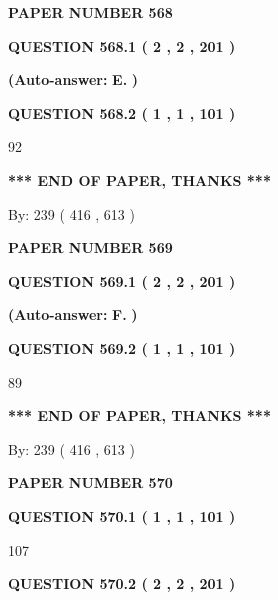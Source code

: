 \documentclass[12pt]{article}
\begin{document}
   
\newpage 
\setcounter{page}{ 
   568001 } 
   
   
 {\textbf{ \Large{ PAPER NUMBER  568  }}}
   
   
   
   
  
  
{\textbf{\large{QUESTION
568.1 
 ( 2 , 2 , 201 )
}}}
 
 
{\textbf{(Auto-answer:}}
{\textbf{\large{
E.}}}
{\textbf{)}}
 
 
  
  
{\textbf{\large{QUESTION
568.2 
 ( 1 , 1 , 101 )
}}}

92
   
   
   
   
\vspace{1.0in} 
{\textbf{\large{ *** END OF PAPER, THANKS *** }}} 
   
   
\hspace{1.0in} By: 
 239 ( 416 ,  613 )
   
   
   
   
\newpage 
\setcounter{page}{ 
   569001 } 
   
   
 {\textbf{ \Large{ PAPER NUMBER  569  }}}
   
   
   
   
  
  
{\textbf{\large{QUESTION
569.1 
 ( 2 , 2 , 201 )
}}}
 
 
{\textbf{(Auto-answer:}}
{\textbf{\large{
F.}}}
{\textbf{)}}
 
 
  
  
{\textbf{\large{QUESTION
569.2 
 ( 1 , 1 , 101 )
}}}

89
   
   
   
   
\vspace{1.0in} 
{\textbf{\large{ *** END OF PAPER, THANKS *** }}} 
   
   
\hspace{1.0in} By: 
 239 ( 416 ,  613 )
   
   
   
   
\newpage 
\setcounter{page}{ 
   570001 } 
   
   
 {\textbf{ \Large{ PAPER NUMBER  570  }}}
   
   
   
   
  
  
{\textbf{\large{QUESTION
570.1 
 ( 1 , 1 , 101 )
}}}

107
  
  
{\textbf{\large{QUESTION
570.2 
 ( 2 , 2 , 201 )
}}}
 
\end{document}

